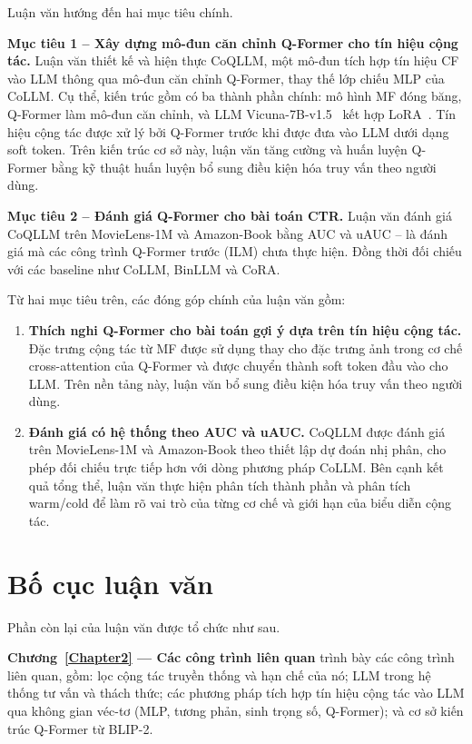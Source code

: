 Luận văn hướng đến hai mục tiêu chính.

\textbf{Mục tiêu 1 -- Xây dựng mô-đun căn chỉnh Q-Former cho tín hiệu cộng tác.} Luận văn
thiết kế và hiện thực CoQLLM, một mô-đun tích hợp tín hiệu CF vào LLM thông qua mô-đun căn chỉnh Q-Former,
thay thế lớp chiếu MLP của CoLLM. Cụ thể, kiến trúc gồm có ba thành phần chính: mô hình MF đóng băng,
Q-Former làm mô-đun căn chỉnh, và LLM Vicuna-7B-v1.5~\cite{vicuna2023} kết hợp LoRA~\cite{lora2021}.
Tín hiệu cộng tác được xử lý bởi Q-Former trước khi được đưa vào LLM dưới dạng soft token.
Trên kiến trúc cơ sở này, luận văn tăng cường và huấn luyện Q-Former bằng kỹ thuật huấn luyện bổ sung
điều kiện hóa truy vấn theo người dùng.

\textbf{Mục tiêu 2 -- Đánh giá Q-Former cho bài toán CTR.} Luận văn đánh giá CoQLLM
trên MovieLens-1M và Amazon-Book bằng AUC và uAUC -- là đánh giá mà các công trình Q-Former trước (ILM)
chưa thực hiện. Đồng thời đối chiếu với các baseline như CoLLM, BinLLM và CoRA.

Từ hai mục tiêu trên, các đóng góp chính của luận văn gồm:

\begin{enumerate}
    \item \textbf{Thích nghi Q-Former cho bài toán gợi ý dựa trên tín hiệu cộng tác.} Đặc
    trưng cộng tác từ MF được sử dụng thay cho đặc trưng ảnh trong cơ chế cross-attention của
    Q-Former và được chuyển thành soft token đầu vào cho LLM. Trên nền tảng này, luận văn bổ
    sung điều kiện hóa truy vấn theo người dùng.

    \item \textbf{Đánh giá có hệ thống theo AUC và uAUC.} CoQLLM được đánh giá trên
    MovieLens-1M và Amazon-Book theo thiết lập dự đoán nhị phân, cho phép đối chiếu trực tiếp
    hơn với dòng phương pháp CoLLM. Bên cạnh kết quả tổng thể, luận văn thực hiện phân tích
    thành phần và phân tích warm/cold để làm rõ vai trò của từng cơ chế và giới hạn của biểu
    diễn cộng tác.
\end{enumerate}

\section{Bố cục luận văn}
\label{sec:bo-cuc}

Phần còn lại của luận văn được tổ chức như sau.

\textbf{Chương~\ref{Chapter2} --- Các công trình liên quan} trình bày các công
trình liên quan, gồm: lọc cộng tác truyền thống và hạn chế của nó; LLM trong hệ thống tư vấn và thách thức;
các phương pháp tích hợp tín hiệu cộng tác vào LLM qua không gian véc-tơ (MLP,
tương phản, sinh trọng số, Q-Former); và cơ sở kiến trúc Q-Former từ BLIP-2.

